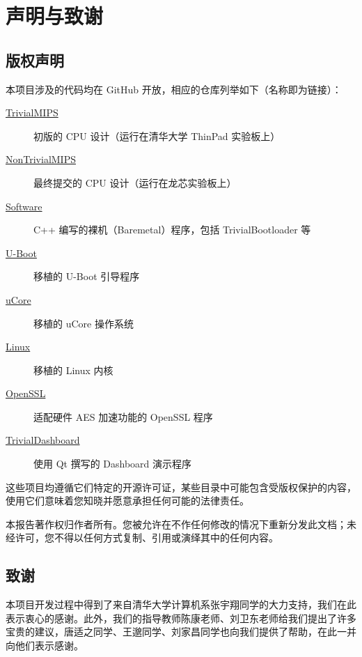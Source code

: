 \chapter{声明与致谢}

\section{版权声明}

本项目涉及的代码均在 GitHub 开放，相应的仓库列举如下（名称即为链接）：

\begin{description}
    \item[\href{https://github.com/trivialmips/TrivialMIPS}{\color{blue} TrivialMIPS}] 初版的 CPU 设计（运行在清华大学 ThinPad 实验板上）
    \item[\href{https://github.com/trivialmips/nontrivial-mips}{\color{blue} NonTrivialMIPS}] 最终提交的 CPU 设计（运行在龙芯实验板上）
    \item[\href{https://github.com/trivialmips/TrivialMIPS_Software}{\color{blue} Software}] C++ 编写的裸机（Baremetal）程序，包括 TrivialBootloader 等
    \item[\href{https://github.com/trivialmips/u-boot-trivialmips}{\color{blue} U-Boot}] 移植的 U-Boot 引导程序
    \item[\href{https://github.com/trivialmips/u-boot-trivialmips}{\color{blue} uCore}] 移植的 uCore 操作系统
    \item[\href{https://github.com/trivialmips/linux-nontrivial-mips}{\color{blue} Linux}] 移植的 Linux 内核
    \item[\href{https://github.com/trivialmips/openssl}{\color{blue} OpenSSL}] 适配硬件 AES 加速功能的 OpenSSL 程序
    \item[\href{https://github.com/trivialmips/trivial-dashboard}{\color{blue} TrivialDashboard}] 使用 Qt 撰写的 Dashboard 演示程序
\end{description}

这些项目均遵循它们特定的开源许可证，某些目录中可能包含受版权保护的内容，使用它们意味着您知晓并愿意承担任何可能的法律责任。

本报告著作权归作者所有。您被允许在不作任何修改的情况下重新分发此文档；未经许可，您不得以任何方式复制、引用或演绎其中的任何内容。

\section{致谢}

本项目开发过程中得到了来自清华大学计算机系张宇翔同学的大力支持，我们在此表示衷心的感谢。此外，我们的指导教师陈康老师、刘卫东老师给我们提出了许多宝贵的建议，唐适之同学、王邈同学、刘家昌同学也向我们提供了帮助，在此一并向他们表示感谢。